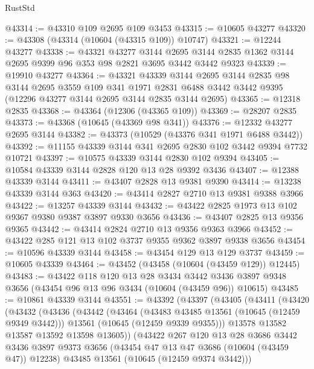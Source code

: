 \begin{lexlean}{RustStd}
\begin{coremodule}
@43314 := @43310 @109 @2695 @109 @3453
@43315 := @10605 @43277
@43320 := @43308 (@43314 (@10604 (@43315 @109)) @10747)
@43321 := @12244 @43277
@43338 := @43321
    @43277
    @3144
    @2695
    @3144
    @2835
    @1362
    @3144
    @2695
    @9399
    @96
    @353
    @98
    @2821
    @3695
    @3442
    @3442
    @9323
@43339 := @19910 @43277
@43364 := @43321
    @43339
    @3144
    @2695
    @3144
    @2835
    @98
    @3144
    @2695
    @3559
    @109
    @341
    @1971
    @2831
    @6488
    @3442
    @3442
    @9395
    (@12296 @43277 @3144 @2695 @3144 @2835 @3144 @2695)
@43365 := @12318 @2835
@43368 := @43364 (@12306 (@43365 @109))
@43369 := @28207 @2835
@43373 := @43368 (@10645 (@43369 @98 @341))
@43376 := @12332 @43277 @2695 @3144
@43382 := @43373 (@10529 (@43376 @341 @1971 @6488 @3442))
@43392 := @11155 @43339 @3144 @341 @2695 @2830 @102 @3442 @9394 @7732 @10721
@43397 := @10575 @43339 @3144 @2830 @102 @9394
@43405 := @10584 @43339 @3144 @2828 @120 @13 @28 @9392 @3436
@43407 := @12388 @43339 @3144
@43411 := @43407 @2828 @13 @9381 @9390
@43414 := @13238 @43339 @3144 @363
@43420 := @43414 @2827 @2710 @13 @9381 @9388 @3966
@43422 := @13257 @43339 @3144
@43432 := @43422 @2825 @1973 @13 @102 @9367 @9380 @9387 @3897 @9330 @3656
@43436 := @43407 @2825 @13 @9356 @9365
@43442 := @43414 @2824 @2710 @13 @9356 @9363 @3966
@43452 := @43422 @285 @121 @13 @102 @3737 @9355 @9362 @3897 @9338 @3656
@43454 := @10596 @43339 @3144
@43458 := @43454 @129 @13 @129 @3737
@43459 := @10605 @43339
@43464 := @43452 (@43458 (@10604 (@43459 @129)) @12445)
@43483 := @43422
    @118
    @120
    @13
    @28
    @3434
    @3442
    @3436
    @3897
    @9348
    @3656
    (@43454 @96 @13 @96 @3434 (@10604 (@43459 @96)) @10615)
@43485 := @10861 @43339 @3144
@43551 := @43392
    (@43397
      (@43405
        (@43411
          (@43420
            (@43432
              (@43436
                (@43442
                  (@43464
                    (@43483 @43485 @13561 (@10645 (@12459 @9349 @3442)))
                    @13561
                    (@10645 (@12459 @9339 @9355)))
                  @13578
                  @13582
                  @13587
                  @13592
                  @13598
                  @13605))
              (@43422
                @267
                @120
                @13
                @28
                @3686
                @3442
                @3436
                @3897
                @9373
                @3656
                (@43454 @47 @13 @47 @3686 (@10604 (@43459 @47)) @12238)
                @43485
                @13561
                (@10645 (@12459 @9374 @3442)))

\end{coremodule}
\end{lexlean}
